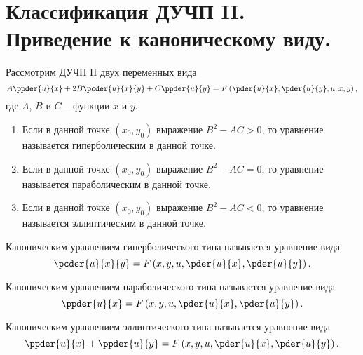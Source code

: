 \chapter{Классификация ДУЧП II. Приведение к каноническому виду.}

Рассмотрим ДУЧП II двух переменных вида
\[
    A\ppder{u}{x} + 2B\pcder{u}{x}{y} + C\ppder{u}{y} = F\left(\pder{u}{x},
    \pder{u}{y}, u, x, y\right),
\]
где \( A \), \( B \) и \( C \) -- функции \( x \) и \( y \).
\begin{enumerate}
    \item Если в данной точке \( (x_0, y_0) \) выражение \( B^2 - AC > 0 \),
    то уравнение называется гиперболическим в данной точке.
    \item Если в данной точке \( (x_0, y_0) \) выражение \( B^2 - AC = 0 \),
    то уравнение называется параболическим в данной точке.
    \item Если в данной точке \( (x_0, y_0) \) выражение \( B^2 - AC < 0 \),
    то уравнение называется эллиптическим в данной точке.
\end{enumerate}

Каноническим уравнением гиперболического типа называется уравнение вида
\[
    \pcder{u}{x}{y} = F\left(x, y, u, \pder{u}{x}, \pder{u}{y}\right).
\]

Каноническим уравнением параболического типа называется уравнение вида
\[
    \ppder{u}{x} = F\left(x, y, u, \pder{u}{x}, \pder{u}{y}\right).
\]

Каноническим уравнением эллиптического типа называется уравнение вида
\[
    \ppder{u}{x} + \ppder{u}{y} = F\left(x, y, u, \pder{u}{x}, \pder{u}{y}
    \right).
\]

